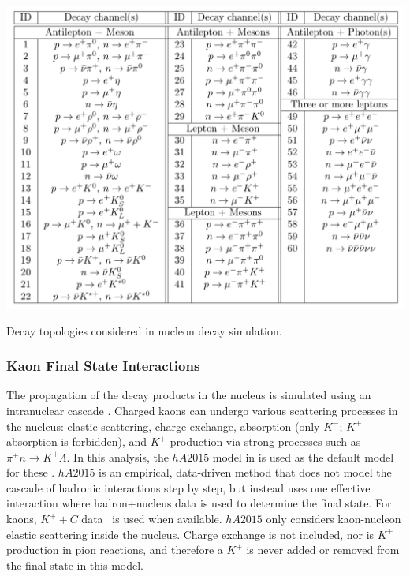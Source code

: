 \begin{table} %
  \includegraphics[width=\linewidth]{graphics/costas_table1}
  \caption[GENIE nucleon decay topologies]{Decay topologies considered in  nucleon decay simulation.}
  \label{tab:genie_ndk}
\end{table}


\subsubsection{Kaon Final State Interactions}
\label{sec:final-state-interactions}

The propagation of the decay products in the nucleus is simulated using an intranuclear cascade . 
Charged kaons can undergo various scattering processes in the nucleus: elastic scattering, charge exchange, absorption (only $K^{-}$; $K^{+}$ absorption is forbidden), and $K^{+}$ production via strong processes such as $\pi^{+}n \rightarrow K^{+} \Lambda$.  In this analysis, the $hA2015$ model in  is used as the default model for these .  $hA2015$ is an empirical, data-driven method that does not model the cascade of hadronic interactions step by step, but instead uses one effective interaction where hadron+nucleus data is used to determine the final state.
For kaons, $K^{+}+C$ data~\cite{Bugg:1968zz,Friedman:1997eq}
is used when available. $hA2015$ only considers kaon-nucleon elastic scattering inside the nucleus.  Charge exchange is not included, nor is $K^+$ production in pion reactions, and therefore a $K^+$ is never added or removed from the final state in this model. 

